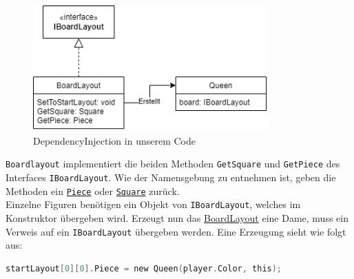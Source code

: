 \documentclass[
10pt, %
a4paper, %
oneside, %
headinclude,footinclude, %
BCOR5mm, %
]{scrartcl}
\begin{document}
\begin{onehalfspace}
\begin{figure}[h]
	\begin{center}
		\includegraphics[width=9cm]{DependencyInjection.png}
		\caption{\label{pic:DependencyInjection}DependencyInjection in unserem Code}
	\end{center}
\end{figure}

\texttt{Boardlayout} implementiert die beiden Methoden \texttt{GetSquare} und \texttt{GetPiece} des Interfaces \texttt{IBoardLayout}. Wie der Namensgebung zu entnehmen ist, geben die Methoden ein \texttt{\href{https://github.com/schmida736/Chess-AdvancedSE/blob/main/Chess-AdvancedSE/Game\%20Elements/Pieces/Piece.cs}{Piece}} oder \texttt{\href{https://github.com/schmida736/Chess-AdvancedSE/blob/main/Chess-AdvancedSE/Game\%20Elements/Square.cs}{Square}} zurück. \\
Einzelne Figuren benötigen ein Objekt von \texttt{IBoardLayout}, welches im Konstruktor übergeben wird. Erzeugt nun das \href{https://github.com/schmida736/Chess-AdvancedSE/blob/main/Chess-AdvancedSE/Game\%20Elements/BoardLayout.cs}{BoardLayout} eine Dame, muss ein Verweis auf ein \texttt{IBoardLayout} übergeben werden. Eine Erzeugung sieht wie folgt aus:

\begin{lstlisting}[language=c, style=mStyle]
startLayout[0][0].Piece = new Queen(player.Color, this);
\end{lstlisting}


\end{onehalfspace}
\end{document}
